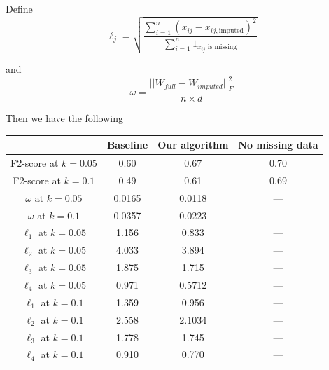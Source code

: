 \documentclass[a4paper]{article}
\begin{document}
Define $$\ell_j = \sqrt{\frac{\sum_{i = 1}^n (x_{ij} - x_{ij, \text{imputed}})^2}{\sum_{i = 1}^n 1_{x_{ij}\text{ is missing}}}}$$

and
$$
\omega = \frac{||W_{full} - W_{imputed}||_F^2}{n \times d}
$$

Then we have the following

\begin{center}
\begin{tabular}{|c|c|c|c|}
    \hline
                                & Baseline  & Our algorithm     & No missing data \\
    \hline
    F2-score at $k = 0.05$      & 0.60      & 0.67              & 0.70 \\
    \hline
    F2-score at $k = 0.1$       & 0.49      & 0.61              & 0.69 \\
    \hline
    $\omega$ at $k = 0.05$      & 0.0165    &    0.0118         & ---\\
    \hline
    $\omega$ at $k = 0.1$       & 0.0357    &    0.0223         & ---\\
    \hline
    $\ell_1$ at $k = 0.05$      & 1.156     &    0.833          & ---\\
    \hline
    $\ell_2$ at $k = 0.05$      & 4.033     &      3.894          & ---\\
    \hline
    $\ell_3$ at $k = 0.05$      & 1.875     &      1.715        & ---\\
    \hline
    $\ell_4$ at $k = 0.05$      & 0.971     &      0.5712        & ---\\
    \hline
    $\ell_1$ at $k = 0.1$       & 1.359     &    0.956         & ---\\
    \hline
    $\ell_2$ at $k = 0.1$       & 2.558     &   2.1034           & ---\\
    \hline
    $\ell_3$ at $k = 0.1$       & 1.778     &    1.745         & ---\\
    \hline
    $\ell_4$ at $k = 0.1$       & 0.910     &    0.770          & ---\\
    \hline

\end{tabular}
\end{center}
\end{document}
